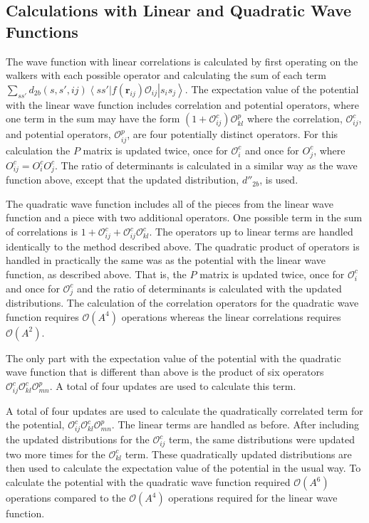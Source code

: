 \documentclass[aps,prl,reprint,superscriptaddress]{revtex4-1}
\newcommand{\ket}[1]{\left| #1 \right>}
\newcommand{\bra}[1]{\left< #1 \right|}
\renewcommand{\O}[2]{\mathcal{O}_{#2}^{#1}}
\renewcommand{\r}{\mathbf{r}}
\renewcommand{\O}{\mathcal{O}}
\begin{document}
\subsection{Calculations with Linear and Quadratic Wave Functions}
The wave function with linear correlations is calculated by first operating on the walkers with each possible operator and calculating the sum of each term $\sum\limits_{ss'}d_{2b}(s,s',ij)\bra{ss'}f(\r_{ij})\mathcal{O}_{ij}\ket{s_is_j}$. The expectation value of the potential with the linear wave function includes correlation and potential operators, where one term in the sum may have the form $\left(1+\O^c_{ij}\right)\O^p_{kl}$ where the correlation, $\O^c_{ij}$, and potential operators, $\O^p_{ij}$, are four potentially distinct operators. For this calculation the $P$ matrix is updated twice, once for $\O^c_i$ and once for $O^c_j$, where $O^c_{ij}=O^c_iO^c_j$. The ratio of determinants is calculated in a similar way as the wave function above, except that the updated distribution, $d''_{2b}$, is used.

The quadratic wave function includes all of the pieces from the linear wave function and a piece with two additional operators. One possible term in the sum of correlations is $1+\O^c_{ij}+\O^c_{ij}\O^c_{kl}$. The operators up to linear terms are handled identically to the method described above. The quadratic product of operators is handled in practically the same was as the potential with the linear wave function, as described above. That is, the $P$ matrix is updated twice, once for $\O^c_i$ and once for $\O^c_j$ and the ratio of determinants is calculated with the updated distributions. The calculation of the correlation operators for the quadratic wave function requires $\mathcal{O}(A^4)$ operations whereas the linear correlations requires $\mathcal{O}(A^2)$.

The only part with the expectation value of the potential with the quadratic wave function that is different than above is the product of six operators $\O^c_{ij}\O^c_{kl}\O^p_{mn}$. A total of four updates are used to calculate this term. 

A total of four updates are used to calculate the quadratically correlated term for the potential, $\O^c_{ij}\O^c_{kl}\O^p_{mn}$. The linear terms are handled as before. After including the updated distributions for the $\O^c_{ij}$ term, the same distributions were updated two more times for the $\O^c_{kl}$ term. These quadratically updated distributions are then used to calculate the expectation value of the potential in the usual way. To calculate the potential with the quadratic wave function required $\mathcal{O}(A^6)$ operations compared to the $\mathcal{O}(A^4)$ operations required for the linear wave function.
\end{document}
